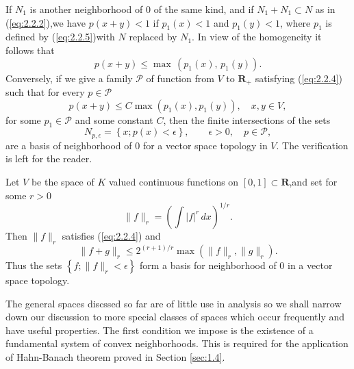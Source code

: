 If $N_1$ is another neighborhood of $0$ of the same kind, and if
$N_1+N_1\subset N$ as in (\ref{eq:2.2.2}),we have $p(x+y)<1$ if
$p_1(x)<1$ and $p_1(y)<1$, where $p_1$ is defined by
(\ref{eq:2.2.5})with $N$ replaced by $N_1$. In view of the homogeneity
it follows that
\begin{displaymath}
  p(x+y)\leq \max\,(p_1(x),\,p_1(y)).
\end{displaymath}
Conversely, if we give a family $\mathcal{P}$ of function from $V$ to
$\mathbf{R}_+$ satisfying (\ref{eq:2.2.4}) such that for every $p\in\mathcal{P}$
\begin{displaymath}
  p(x+y)\leq C\max(p_1(x),p_1(y)),\quad x,y\in V,
\end{displaymath}
for some $p_1\in\mathcal{P}$ and some constant $C$, then the finite
intersections of the sets
\begin{displaymath}
  N_{p,\epsilon}=\left\{ x;p(x)<\epsilon \right\},\qquad\epsilon>0,\quad p\in\mathcal{P},
\end{displaymath}
are a basis of neighborhood of $0$ for a vector space topology in
$V$. The verification is left for the reader.
\begin{exa}
  Let $V$ be the space of $K$ valued continuous functions on
  $[0,1]\subset \mathbf{R}$,and set for some $r>0$
  \begin{displaymath}
    \|f\|_r=\left( \int|f|^r\,dx \right)^{1/r}.
  \end{displaymath}
Then $\|f\|_r$ satisfies (\ref{eq:2.2.4}) and
\begin{displaymath}
  \|f+g\|_r\leq 2^{(r+1)/r}\max(\|f\|_r,\|g\|_r).
\end{displaymath}
Thus the sets $\left\{ f;\|f\|_r<\epsilon \right\}$ form a basis for
neighborhood of $0$ in a vector space topology.
\end{exa}
The general spaces discssed so far are of little use in analysis so we
shall narrow down our discussion to more special classes of spaces
which occur frequently and have useful properties. The first condition
we impose is the existence of a fundamental system of convex
neighborhoods. This is required for the application of Hahn-Banach
theorem proved in Section \ref{sec:1.4}. 
\newcommand{\tvs}{Topological vector spaces}
\newcommand{\lctvs}{Locally convex topological vector spaces}
\newcommand{\sns}{Semi-normed spaces} \newcommand{\ns}{Normed spaces}
\newcommand{\phs}{Pre-Hilbert spaces} \newcommand{\fs}{Fr\'echet
  spaces} \newcommand{\Bs}{Banach spaces} \newcommand{\hs}{Hilbert
  spaces} \newcommand{\comb}{
\begin{tabular}{c}
  \tvs\\$\Downarrow$\\\lctvs
\end{tabular}
}
